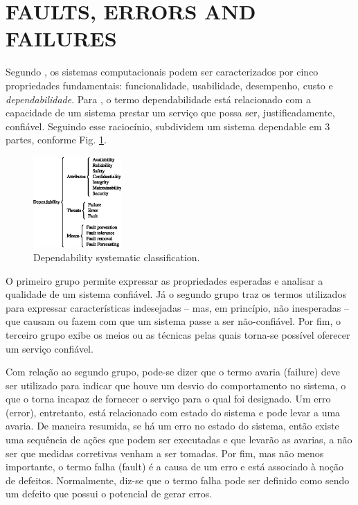 \documentclass[10pt,fleqn,a4paper]{article}
\begin{document}
\section{FAULTS, ERRORS AND FAILURES}\label{sec:eff}
Segundo \citet{kaaniche:2002}, os sistemas computacionais podem ser
caracterizados por cinco propriedades fundamentais: funcionalidade, usabilidade,
desempenho, custo e {\it dependabilidade}. Para \citet{laprie:1992}, o termo
dependabilidade está relacionado com a capacidade de um sistema prestar um
serviço que possa ser, justificadamente, confiável. Seguindo esse raciocínio,
\citet{avizienis:2000} subdividem um sistema dependable em 3 partes, conforme
Fig. \ref{fig:div_avizienis}.

\begin{figure}[htb]
\centering
\footnotesize
\includegraphics[width=0.3\textwidth]{imgs/div_avizienis}
\caption{Dependability systematic classification.}
\label{fig:div_avizienis}
\end{figure}

O primeiro grupo permite expressar as propriedades esperadas e analisar a
qualidade de um sistema confiável. Já o segundo grupo traz os termos utilizados
para expressar características indesejadas -- mas, em princípio, não inesperadas
-- que causam ou fazem com que um sistema passe a ser não-confiável. Por fim, o
terceiro grupo exibe os meios ou as técnicas pelas quais torna-se possível
oferecer um serviço confiável.

Com relação ao segundo grupo, pode-se dizer que o termo avaria (failure) deve
ser utilizado para indicar que houve um desvio do comportamento no sistema, o
que o torna incapaz de fornecer o serviço para o qual foi designado. Um erro
(error), entretanto, está relacionado com estado do sistema e pode levar a uma
avaria. De maneira resumida, se há um erro no estado do sistema, então existe
uma sequência de ações que podem ser executadas e que levarão as avarias, a não
ser que medidas corretivas venham a ser tomadas. Por fim, mas não menos
importante, o termo falha (fault) é a causa de um erro e está associado à noção
de defeitos. Normalmente, diz-se que o termo falha pode ser definido como sendo
um defeito que possui o potencial de gerar erros.
\end{document}
